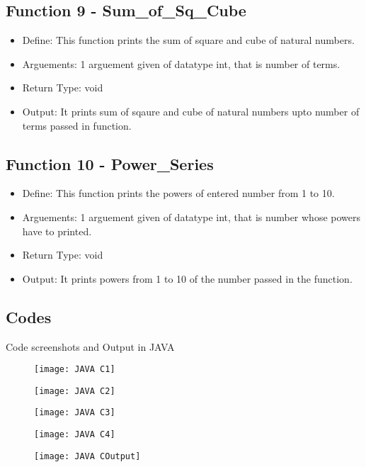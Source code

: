 \documentclass[12pt,a4paper]{article}
\begin{document}
\subsection*{Function 9 - Sum\_of\_Sq\_Cube}
\begin{itemize}
\item Define: This function prints the sum of square and cube of natural numbers.
\item Arguements:  1 arguement given of datatype int, that is number of terms.
\item Return Type: void
\item Output: It prints sum of sqaure and cube of natural numbers upto number of terms passed in function.
\end{itemize}

\subsection*{Function 10 - Power\_Series}
\begin{itemize}
\item Define: This function prints the powers of entered number from 1 to 10.
\item Arguements: 1 arguement given of datatype int, that is number whose powers have to printed.
\item Return Type: void
\item Output: It prints powers from 1 to 10 of the number passed in the function.
\end{itemize}

\pagebreak
\begin{center}
\section*{\textbf{\Large Codes}}
Code screenshots and Output in JAVA
\begin{figure}[p]
\texttt{[image: JAVA C1]}
\end{figure}
\begin{figure}[]
\texttt{[image: JAVA C2]}
\end{figure}
\begin{figure}[]
\texttt{[image: JAVA C3]}
\end{figure}
\begin{figure}[]
\texttt{[image: JAVA C4]}
\end{figure}
\begin{figure}[]
\texttt{[image: JAVA COutput]}
\end{figure}
\end{center}
\end{document}
